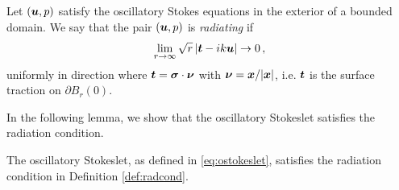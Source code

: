 \begin{definition} \label{def:radcond}
Let $({\boldsymbol u},p)$ satisfy the oscillatory Stokes equations in
the exterior of a bounded domain. We say that
the pair $({\boldsymbol u},p)$ is {\em radiating} if
\begin{equation}
\lim_{r\to \infty} \sqrt{r} \left| {\boldsymbol t} - i k {\boldsymbol u} \right| \to 0 \, ,
\label{eq:radcond}
\end{equation}
uniformly in direction where ${\boldsymbol t} = {\boldsymbol \sigma} \cdot {\boldsymbol \nu}$
with ${\boldsymbol \nu} = {\boldsymbol x}/|{\boldsymbol x}|$, i.e. ${\boldsymbol t}$ is the surface
traction on $\partial B_r(0)$.     
\end{definition}

In the following lemma, we show that the oscillatory
Stokeslet satisfies the radiation condition. 
\begin{lem}
The oscillatory Stokeslet, as defined in \eqref{eq:ostokeslet}, 
satisfies the radiation condition in Definition \ref{def:radcond}.
\end{lem}
